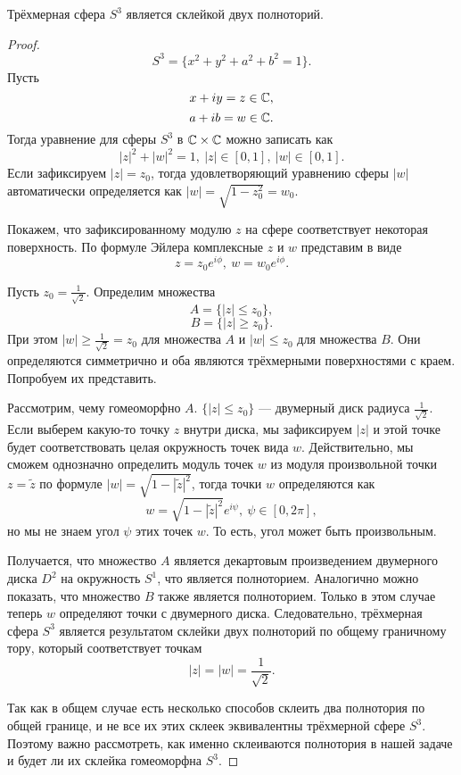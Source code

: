 \begin{statement}
    Трёхмерная сфера $S^3$ является склейкой двух полноторий.
\end{statement} 
\begin{proof}
    \[S^3 = \{x^2+y^2+a^2+b^2=1\}.\]
    Пусть 
    \[x+iy = z \in \mathbb{C},\]
    \[a+ib = w \in \mathbb{C}.\]
    Тогда уравнение для сферы $S^3$ в $\mathbb{C} \times \mathbb{C}$ можно записать как
    \[|z|^2 + |w|^2 = 1, \ |z| \in [0,1], \ |w| \in [0,1].\]
    Если зафиксируем $|z| = z_0$, тогда удовлетворяющий уравнению сферы $|w|$ автоматически определяется как $|w| = \sqrt{1-z_0^2} = w_0$.

    Покажем, что зафиксированному модулю $z$ на сфере соответствует некоторая поверхность. По формуле Эйлера комплексные $z$ и $w$ представим в виде 
    \[z = z_0 e^{i\phi}, \ w = w_0 e^{i\phi}.\]

    Пусть $z_0 = \frac{1}{\sqrt2}$. Определим множества 
    \[A = \{|z| \leqslant z_0\},\]
    \[B = \{|z| \geqslant z_0\}.\]
    При этом $|w| \geqslant \frac{1}{\sqrt2} = z_0$ для множества $A$ и $|w| \leqslant z_0$ для множества $B$. Они определяются симметрично и оба являются трёхмерными поверхностями с краем. Попробуем их представить.

    Рассмотрим, чему гомеоморфно $A$. $\{|z| \leqslant z_0\}$ — двумерный диск радиуса $\frac{1}{\sqrt2}$. Если выберем какую-то точку $z$ внутри диска, мы зафиксируем $|z|$ и этой точке будет соответствовать целая окружность точек вида $w$. Действительно, мы сможем однозначно определить модуль точек $w$ из модуля произвольной точки $z = \tilde{z}$ по формуле $|w| = \sqrt{1-|\tilde{z}|^2}$, тогда точки $w$ определяются как $$w = \sqrt{1-|\tilde{z}|^2} e^{i\psi}, \ \psi \in [0,2\pi],$$
    но мы не знаем угол $\psi$ этих точек $w$. То есть, угол может быть произвольным.

    Получается, что множество $A$ является декартовым произведением двумерного диска $D^2$ на окружность $S^1$, что является полноторием. Аналогично можно показать, что множество $B$ также является полноторием. Только в этом случае теперь $w$ определяют точки с двумерного диска. Следовательно, трёхмерная сфера $S^3$ является результатом склейки двух полноторий по общему граничному тору, который соответствует точкам 
    \[|z| = |w| = \frac{1}{\sqrt2}.\]

    Так как в общем случае есть несколько способов склеить два полнотория по общей границе, и не все их этих склеек эквивалентны трёхмерной сфере $S^3$. Поэтому важно рассмотреть, как именно склеиваются полнотория в нашей задаче и будет ли их склейка гомеоморфна $S^3$.


\end{proof}
